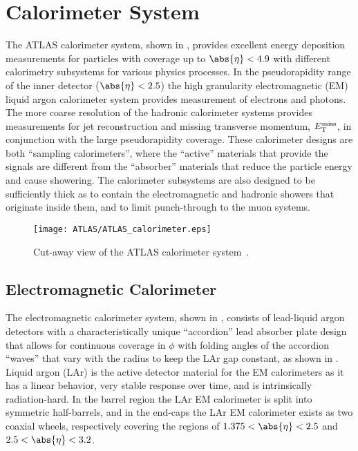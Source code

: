 \section{Calorimeter System}\label{sec:ATLAS_calo}

The ATLAS calorimeter system, shown in , provides excellent energy deposition measurements for particles with coverage up to $\abs{\eta} < 4.9$ with different calorimetry subsystems for various physics processes.
In the pseudorapidity range of the inner detector ($\abs{\eta} < 2.5$) the high granularity electromagnetic (EM) liquid argon calorimeter system provides measurement of electrons and photons.
The more coarse resolution of the hadronic calorimeter systems provides measurements for jet reconstruction and missing transverse momentum, $E_{\mathrm{T}}^{\mathrm{miss}}$, in conjunction with the large pseudorapidity coverage.
These calorimeter designs are both ``sampling calorimeters'', where the ``active'' materials that provide the signals are different from the ``absorber'' materials that reduce the particle energy and cause showering.
The calorimeter subsystems are also designed to be sufficiently thick as to contain the electromagnetic and hadronic showers that originate inside them, and to limit punch-through to the muon systems.

\begin{figure}[htbp]
 \centering
 \texttt{[image: ATLAS/ATLAS\_calorimeter.eps]}
 \caption[Cut-away view of the ATLAS calorimeter system.]{%
  Cut-away view of the ATLAS calorimeter system~\cite{Pequenao:1095927}.}\label{fig:ATLAS_calorimeter}
\end{figure}

\subsection{Electromagnetic Calorimeter}\label{sec:ATLAS_electromagnetic_calorimeter}

The electromagnetic calorimeter system, shown in , consists of lead-liquid argon detectors with a characteristically unique ``accordion'' lead absorber plate design that allows for continuous coverage in $\phi$ with folding angles of the accordion ``waves'' that vary with the radius to keep the LAr gap constant, as shown in .
Liquid argon (LAr) is the active detector material for the EM calorimeters as it has a linear behavior, very stable response over time, and is intrinsically radiation-hard.
In the barrel region the LAr EM calorimeter is split into symmetric half-barrels, and in the end-caps the LAr EM calorimeter exists as two coaxial wheels, respectively covering the regions of $1.375 < \abs{\eta} < 2.5$ and $2.5 < \abs{\eta} < 3.2$.


